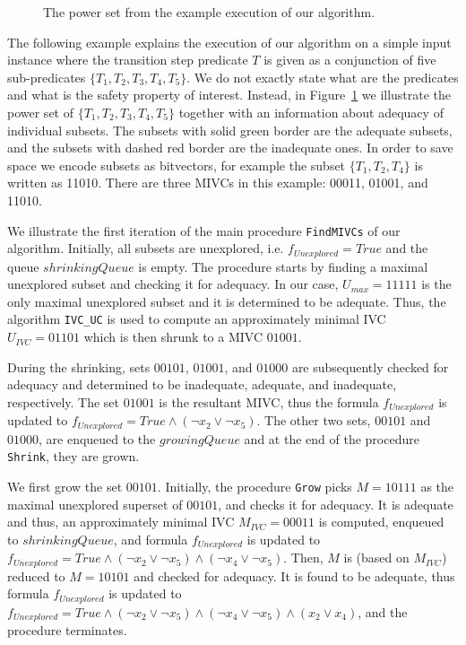 \begin{figure}[t]
\centering

\caption{The power set from the example execution of our algorithm.}
\label{fig:running_cube}
\end{figure}

The following example explains the execution of our algorithm on a simple input instance where the transition step predicate $T$ is given as a conjunction of five sub-predicates $\{T_1, T_2, T_3, T_4, T_5\}$. We do not exactly state what are the predicates and what is the safety property of interest. Instead, in Figure~\ref{fig:running_cube} we illustrate the power set of $\{T_1, T_2, T_3, T_4, T_5\}$ together with an information about adequacy of individual subsets. The subsets with solid green border are the adequate subsets, and the subsets with dashed red border are the inadequate ones. In order to save space we encode subsets as bitvectors, for example the subset $\{T_1, T_2, T_4\}$ is written as 11010. There are three MIVCs in this example: 00011, 01001, and 11010.

We illustrate the first iteration of the main procedure \texttt{FindMIVCs} of our algorithm. Initially, all subsets are unexplored, i.e. $f_{\mathit{Unexplored}} = True$ and the queue $\mathit{shrinkingQueue}$ is empty. The procedure starts by finding a maximal unexplored subset and checking it for adequacy. In our case, $U_{\mathit{max}} = 11111$ is the only maximal unexplored subset and it is determined to be adequate. Thus, the algorithm \texttt{IVC\_UC} is used to compute an approximately minimal IVC $U_{\mathit{IVC}} = 01101$ which is then shrunk to a MIVC $01001$.

During the shrinking, sets $00101$, $01001$, and $01000$ are subsequently checked for adequacy and determined to be inadequate, adequate, and inadequate, respectively. The set $01001$ is the resultant MIVC, thus the formula $f_{\mathit{Unexplored}}$ is updated to $f_{\mathit{Unexplored}} = \mathit{True} \wedge (\neg x_2 \vee \neg x_5)$. The other two sets, $00101$ and $01000$, are enqueued to the $\mathit{growingQueue}$ and at the end of the procedure \texttt{Shrink}, they are grown.

We first grow the set $00101$. Initially, the procedure \texttt{Grow} picks $M = 10111$ as the maximal unexplored superset of $00101$, and checks it for adequacy. It is adequate and thus, an approximately minimal IVC $M_{\mathit{IVC}} = 00011$ is computed, enqueued to $\mathit{shrinkingQueue}$, and formula $f_{\mathit{Unexplored}}$ is updated to $f_{\mathit{Unexplored}} = \mathit{True} \wedge (\neg x_2 \vee \neg x_5) \wedge	(\neg x_4 \vee \neg x_5)$. Then, $M$ is (based on $M_{\mathit{IVC}}$) reduced to $M = 10101$ and checked for adequacy. It is found to be adequate, thus formula $f_{\mathit{Unexplored}}$ is updated to $f_{\mathit{Unexplored}} = \mathit{True} \wedge (\neg x_2 \vee \neg x_5) \wedge	(\neg x_4 \vee \neg x_5) \wedge (x_2 \vee x_4)$, and the procedure terminates.

